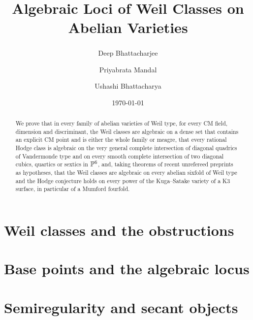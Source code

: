 \documentclass[11pt,reqno]{amsart}
\title[Algebraic loci of Weil classes]
      {Algebraic Loci of Weil Classes on Abelian Varieties}
\author{Deep Bhattacharjee\textsuperscript{\dag}}
\author{Priyabrata Mandal}
\author{Ushashi Bhattacharya}
\date{\today}
\begin{document}
\begin{abstract}
We prove that in every family of abelian varieties of Weil type, for every CM
field, dimension and discriminant, the Weil classes are algebraic on a dense
set that contains an explicit CM point and is either the whole family or
meagre, that every rational Hodge class is algebraic on the very general
complete intersection of diagonal quadrics of Vandermonde type and on every
smooth complete intersection of two diagonal cubics, quartics or sextics in
$\mathbb{P}^{6}$, and, taking theorems of recent unrefereed preprints as
hypotheses, that the Weil classes are algebraic on every abelian sixfold of
Weil type and the Hodge conjecture holds on every power of the Kuga--Satake
variety of a K3 surface, in particular of a Mumford fourfold.
\end{abstract}

\maketitle

\setcounter{tocdepth}{0}
\vspace*{-18pt}
\begingroup
\setlength{\parskip}{0pt}
\tableofcontents
\endgroup
\vspace*{-4pt}



\part{Weil classes and the obstructions}\label{part:obstructions}













\part{Base points and the algebraic locus}\label{part:basepoints}





\part{Semiregularity and secant objects}\label{part:semiregularity}




\end{document}
